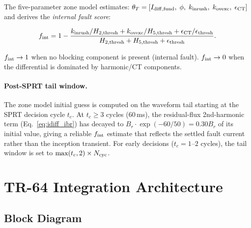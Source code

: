 \documentclass[11pt, a4paper]{article}
\newcommand{\fint}{f_{\rm int}}
\begin{document}
The five-parameter zone model \cite{SAMBP_TR57} estimates:
$\theta_T = [I_{\rm diff,fund},\;\phi,\;k_{\rm inrush},\;k_{\rm ovexc},\;
\epsilon_{\rm CT}]$ and derives the \emph{internal fault score}:

\begin{equation}
  \fint = 1 - \frac{k_{\rm inrush}/H_{2,\rm thresh}
                    + k_{\rm ovexc}/H_{5,\rm thresh}
                    + \epsilon_{\rm CT}/\epsilon_{\rm thresh}}
                   {H_{2,\rm thresh} + H_{5,\rm thresh} + \epsilon_{\rm thresh}}.
  \label{eq:f_int}
\end{equation}

$\fint \to 1$ when no blocking component is present (internal fault).
$\fint \to 0$ when the differential is dominated by harmonic/CT components.

\paragraph{Post-SPRT tail window.}
The zone model initial guess is computed on the waveform tail starting at
the SPRT decision cycle $t_c$.  At $t_c \geq 3$ cycles (60\,ms), the
residual-flux 2nd-harmonic term (Eq.~\ref{eq:idiff_ibr}) has decayed to
$B_r \cdot \exp(-60/50) = 0.30 B_r$ of its initial value, giving a
reliable $\fint$ estimate that reflects the settled fault current rather than
the inception transient.  For early decisions ($t_c = 1$--$2$ cycles),
the tail window is set to $\max(t_c, 2) \times N_{\rm cyc}$.


\section{TR-64 Integration Architecture}
\label{sec:architecture}

\subsection{Block Diagram}
\end{document}
